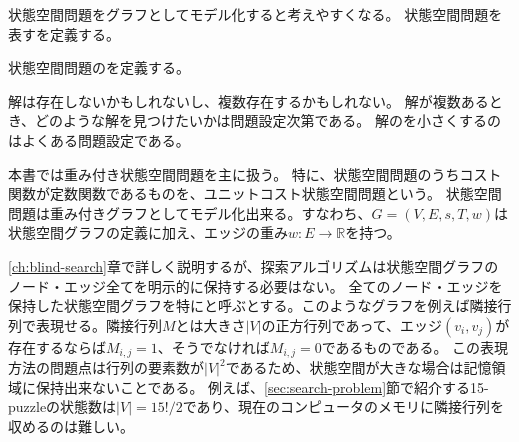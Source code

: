 状態空間問題をグラフとしてモデル化すると考えやすくなる。
状態空間問題を表すを定義する。


状態空間問題のを定義する。


解は存在しないかもしれないし、複数存在するかもしれない。
解が複数あるとき、どのような解を見つけたいかは問題設定次第である。
解のを小さくするのはよくある問題設定である。



本書では重み付き状態空間問題を主に扱う。
特に、状態空間問題のうちコスト関数が定数関数であるものを、ユニットコスト状態空間問題という。
状態空間問題は重み付きグラフとしてモデル化出来る。すなわち、$G = (V, E, s, T, w)$は状態空間グラフの定義に加え、エッジの重み$w: E \rightarrow \mathbb{R}$を持つ。

\ref{ch:blind-search}章で詳しく説明するが、探索アルゴリズムは状態空間グラフのノード・エッジ全てを明示的に保持する必要はない。
全てのノード・エッジを保持した状態空間グラフを特にと呼ぶとする。このようなグラフを例えば隣接行列で表現せる。隣接行列$M$とは大きさ$|V|$の正方行列であって、エッジ$(v_i, v_j)$が存在するならば$M_{i,j}=1$、そうでなければ$M_{i,j}=0$であるものである。
この表現方法の問題点は行列の要素数が$|V|^2$であるため、状態空間が大きな場合は記憶領域に保持出来ないことである。
例えば、\ref{sec:search-problem}節で紹介する15-puzzleの状態数は$|V|=15!/2$であり、現在のコンピュータのメモリに隣接行列を収めるのは難しい。

